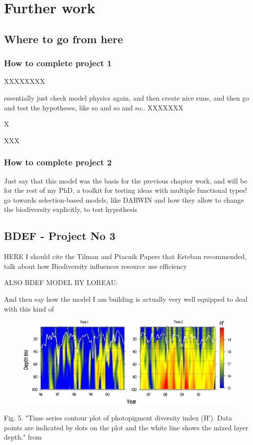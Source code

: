 \chapter {Further work}

\section{Where to go from here}

\subsection{How to complete project 1}

XXXXXXXX

essentially just check model physics again, and then
create nice runs, and then go and test the hypotheses, like so and so and so..
XXXXXXX

X

XXX


\subsection{How to complete project 2}


Just say that this model was the basis for the previous chapter work, and will be for the rest of my PhD, a toolkit for testing ideas with multiple functional types! go towards selection-based models, like DARWIN
and how they allow to change the biodiversity explicitly, to test hypothesis




\section{BDEF - Project No 3}

 HERE I should cite the Tilman and Ptacnik Papers that Esteban recommended, talk about how Biodiversity influences resource use efficiency
 
ALSO BDEF MODEL BY LOREAU: \citep{Loreau1998b}
 
 And then say how the model I am building is actually very well equipped to deal with this kind of 

\begin{figure}[h]
\centering
\includegraphics[trim = 0mm 0mm 0mm 0mm, clip, width=.8\linewidth]{./Chp3-Further/PinckneyDiversityPigmentData.jpg}
\end{figure}
Fig. 5. "Time series contour plot of photopigment diversity index (H′). Data points are indicated by dots on the plot and the white line shows the mixed layer depth." from \citet{Pinckney2015}

